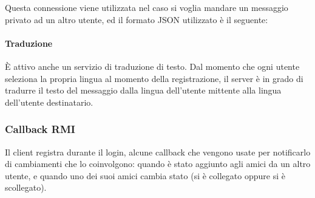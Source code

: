 Questa connessione viene utilizzata nel caso si voglia mandare un messaggio privato ad un altro utente, ed il formato JSON utilizzato è il seguente: \\
\cprotect[mm]

\paragraph{Traduzione}
È attivo anche un servizio di traduzione di testo. Dal momento che ogni utente seleziona la propria lingua al momento della registrazione, il server è in grado di tradurre il testo del messaggio dalla lingua dell'utente mittente alla lingua dell'utente destinatario.

\subsubsection{Callback RMI}
Il client registra durante il login, alcune callback che vengono usate per notificarlo di cambiamenti che lo coinvolgono: quando è stato aggiunto agli amici da un altro utente, e quando uno dei suoi amici cambia stato (si è collegato oppure si è scollegato).